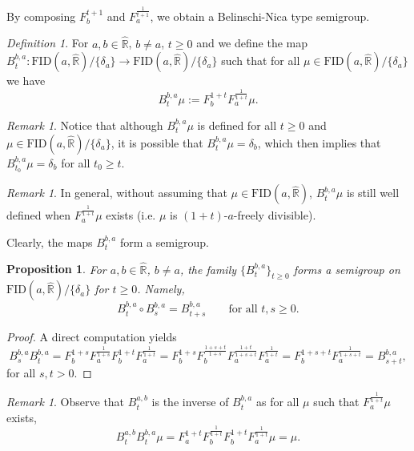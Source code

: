 \documentclass[reqno,11pt]{amsart}
\newtheorem{proposition}[theorem]{Proposition}
\theoremstyle{remark}
\newtheorem{remark}[theorem]{Remark}
\newtheorem{definition}[theorem]{Definition}
\newcommand{\rr}{\mathbb{R}}
\newcommand{\pfreepower}[2]{F_{#1}^{#2}}
\begin{document}
By composing $\pfreepower{b}{t+1} $ and $\pfreepower{a}{\tfrac{1}{t+1}} $, we obtain a Belinschi-Nica type semigroup.

\begin{definition}
For $a,b\in \hat{\rr}$, $b\neq a$, $t\geq 0$ and we define the map $ B^{b,a}_t: \text{FID}(a,\hat{\rr})/\{\delta_a\}\to \text{FID}(a,\hat{\rr})/\{\delta_a\}$ such that for all $\mu \in \text{FID}(a,\hat{\rr})/\{\delta_a\}$ we have
$$ B^{b,a}_t\mu := \pfreepower{b}{1+t}\pfreepower{a}{\frac{1}{1+t}}\mu.$$   
\end{definition}

\begin{remark}
Notice that although $ B^{b,a}_t\mu $ is defined for all $t\geq 0$ and $\mu \in \text{FID}(a,\hat{\rr})/\{\delta_a\}$, it is possible that $ B^{b,a}_t\mu =\delta_b $, which then implies that $ B^{b,a}_{t_0}\mu =\delta_b $ for all $t_0\geq t$.
\end{remark}

\begin{remark}
    In general, without assuming that $\mu\in \text{FID}(a,\hat{\rr})$, $ B^{b,a}_t\mu $ is still well defined when $ \pfreepower{a}{\frac{1}{1+t}}\mu $ exists (i.e. $ \mu $ is $(1+t)$-$a$-freely divisible).
\end{remark}

Clearly, the maps $B^{b,a}_t$ form a semigroup.

\begin{proposition}
For $a,b\in \hat{\rr}$, $b\neq a$, the family $\{ B^{b,a}_t \}_{t\geq 0} $ forms a semigroup on $ \text{FID}(a,\hat{\rr})/\{\delta_a\} $ for $t\geq 0$. Namely,
$$B^{b,a}_t \circ B^{b,a}_s =B^{b,a}_{t+s}\qquad \text{for all } t,s \geq 0.$$ 
\end{proposition}

\begin{proof}
A direct computation yields 
$$ B^{b,a}_s B^{b,a}_t=\pfreepower{b}{1+s}\pfreepower{a}{\frac{1}{1+s}} \pfreepower{b}{1+t}\pfreepower{a}{\frac{1}{1+t}} = \pfreepower{b}{1+s}\pfreepower{b}{\frac{1+s+t}{1+s}}\pfreepower{a}{\frac{1+t}{1+s+t}} \pfreepower{a}{\frac{1}{1+t}}  = \pfreepower{b}{1+s+t} \pfreepower{a}{\frac{1}{1+s+t}}  = B^{b,a}_{s+t}, $$
for all $s,t>0$.
\end{proof}



\begin{remark}
Observe that $ B_{t}^{a,b} $ is the inverse of $ B_t^{b,a} $ as for all $\mu$ such that $ \pfreepower{a}{\frac{1}{1+t}}\mu $ exists,
$$ B_{t}^{a,b}B_t^{b,a}\mu = \pfreepower{a}{{1+t}}\pfreepower{b}{\frac{1}{1+t}}\pfreepower{b}{1+t}\pfreepower{a}{\frac{1}{1+t}}\mu = \mu. $$
\end{remark}
\end{document}
